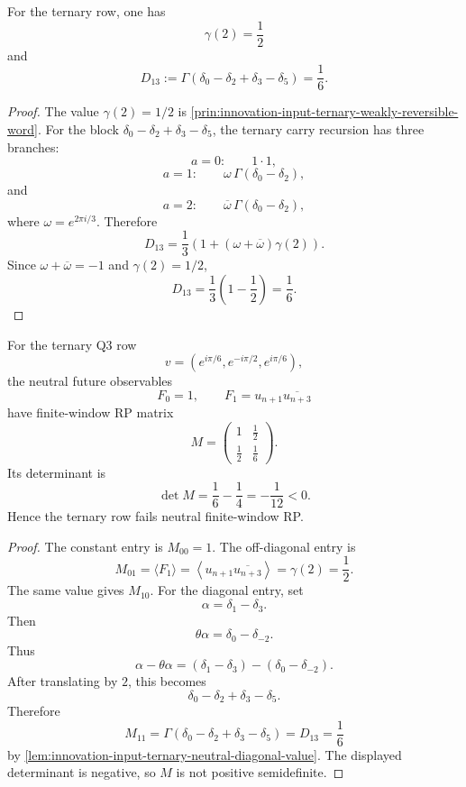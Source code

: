 \begin{lemma}
\label{lem:innovation-input-ternary-neutral-diagonal-value}
For the ternary row, one has
$$
\gamma(2)=\frac12
$$
and
$$
D_{13}
:=
\Gamma(\delta_0-\delta_2+\delta_3-\delta_5)
=
\frac16.
$$
\end{lemma}

\begin{proof}
The value $\gamma(2)=1/2$ is
\autoref{prin:innovation-input-ternary-weakly-reversible-word}. For the
block $\delta_0-\delta_2+\delta_3-\delta_5$, the ternary carry recursion
has three branches:
$$
a=0:
\qquad
1\cdot1,
$$
$$
a=1:
\qquad
\omega\,\Gamma(\delta_0-\delta_2),
$$
and
$$
a=2:
\qquad
\overline\omega\,\Gamma(\delta_0-\delta_2),
$$
where $\omega=e^{2\pi i/3}$. Therefore
$$
D_{13}
=
\frac13
\left(
1+(\omega+\overline\omega)\gamma(2)
\right).
$$
Since $\omega+\overline\omega=-1$ and $\gamma(2)=1/2$,
$$
D_{13}
=
\frac13\left(1-\frac12\right)
=
\frac16.
$$
\end{proof}

\begin{theorem}
\label{thm:innovation-input-ternary-neutral-rp-obstruction}
For the ternary Q3 row
$$
v=(e^{i\pi/6},e^{-i\pi/2},e^{i\pi/6}),
$$
the neutral future observables
$$
F_0=1,
\qquad
F_1=u_{n+1}\overline{u_{n+3}}
$$
have finite-window RP matrix
$$
M=
\left(
\begin{array}{cc}
1 & \frac12\\
\frac12 & \frac16
\end{array}
\right).
$$
Its determinant is
$$
\det M=\frac16-\frac14=-\frac1{12}<0.
$$
Hence the ternary row fails neutral finite-window RP.
\end{theorem}

\begin{proof}
The constant entry is $M_{00}=1$. The off-diagonal entry is
$$
M_{01}
=
\langle F_1\rangle
=
\left\langle u_{n+1}\overline{u_{n+3}}\right\rangle
=
\gamma(2)
=
\frac12.
$$
The same value gives $M_{10}$. For the diagonal entry, set
$$
\alpha=\delta_1-\delta_3.
$$
Then
$$
\theta\alpha=\delta_0-\delta_{-2}.
$$
Thus
$$
\alpha-\theta\alpha
=
(\delta_1-\delta_3)-(\delta_0-\delta_{-2}).
$$
After translating by $2$, this becomes
$$
\delta_0-\delta_2+\delta_3-\delta_5.
$$
Therefore
$$
M_{11}
=
\Gamma(\delta_0-\delta_2+\delta_3-\delta_5)
=
D_{13}
=
\frac16
$$
by \autoref{lem:innovation-input-ternary-neutral-diagonal-value}. The
displayed determinant is negative, so $M$ is not positive semidefinite.
\end{proof}


